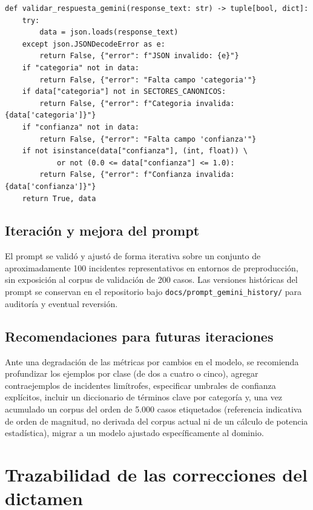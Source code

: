 \begin{lstlisting}[caption={Validación de la respuesta de Gemini (resumen).},label={lst:validar-gemini}]
def validar_respuesta_gemini(response_text: str) -> tuple[bool, dict]:
    try:
        data = json.loads(response_text)
    except json.JSONDecodeError as e:
        return False, {"error": f"JSON invalido: {e}"}
    if "categoria" not in data:
        return False, {"error": "Falta campo 'categoria'"}
    if data["categoria"] not in SECTORES_CANONICOS:
        return False, {"error": f"Categoria invalida: {data['categoria']}"}
    if "confianza" not in data:
        return False, {"error": "Falta campo 'confianza'"}
    if not isinstance(data["confianza"], (int, float)) \
            or not (0.0 <= data["confianza"] <= 1.0):
        return False, {"error": f"Confianza invalida: {data['confianza']}"}
    return True, data
\end{lstlisting}

\subsection{Iteración y mejora del prompt}\label{subsec:anexo-iteracion-prompt}

El prompt se validó y ajustó de forma iterativa sobre un conjunto de aproximadamente 100 incidentes representativos en entornos de preproducción, sin exposición al corpus de validación de 200 casos. Las versiones históricas del prompt se conservan en el repositorio bajo \texttt{docs/prompt\_gemini\_history/} para auditoría y eventual reversión.

\subsection{Recomendaciones para futuras iteraciones}\label{subsec:anexo-recomendaciones-prompt}

Ante una degradación de las métricas por cambios en el modelo, se recomienda profundizar los ejemplos por clase (de dos a cuatro o cinco), agregar contraejemplos de incidentes limítrofes, especificar umbrales de confianza explícitos, incluir un diccionario de términos clave por categoría y, una vez acumulado un corpus del orden de 5.000 casos etiquetados (referencia indicativa de orden de magnitud, no derivada del corpus actual ni de un cálculo de potencia estadística), migrar a un modelo ajustado específicamente al dominio.

\section{Trazabilidad de las correcciones del dictamen}\label{sec:anexo-trazabilidad}

